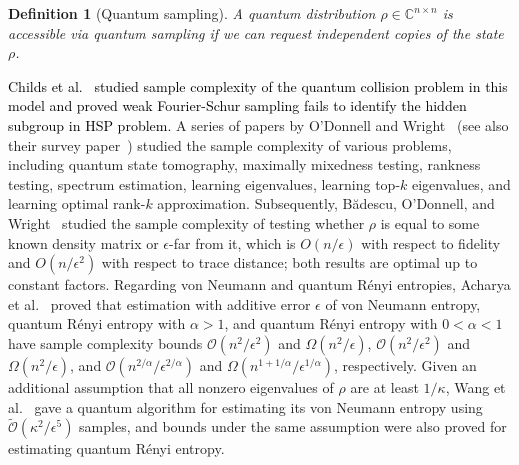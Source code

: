 \documentclass[journal]{IEEEtran}
\newtheorem{definition}{Definition}
\begin{document}
\begin{definition}[Quantum sampling]
    \label{defn:q-sample-def}
    A quantum distribution $\rho\in\mathbb{C}^{n\times n}$ is accessible via quantum sampling if we can request independent copies of the state $\rho$.
\end{definition}

\textcolor{black}{Childs et al.~\cite{childs2007weak} studied sample complexity of the quantum collision problem in this model and proved weak Fourier-Schur sampling fails to identify the hidden subgroup in HSP problem.} A series of papers by O'Donnell and Wright~\cite{OW15,OW16,OW17} (see also their survey paper~\cite{odonnell2017guest}) studied the sample complexity of various problems, including quantum state tomography, maximally mixedness testing, rankness testing, spectrum estimation, learning eigenvalues, learning top-$k$ eigenvalues, and learning optimal rank-$k$ approximation. Subsequently, B{\u{a}}descu, O'Donnell, and Wright~\cite{badescu2019quantum} studied the sample complexity of testing whether $\rho$ is equal to some known density matrix or $\epsilon$-far from it, which is $O(n/\epsilon)$ with respect to fidelity and $O(n/\epsilon^2)$ with respect to trace distance; both results are optimal up to constant factors. Regarding von Neumann and quantum R{\'e}nyi entropies, Acharya et al.~\cite{acharya2019measuring} proved that estimation with additive error $\epsilon$ of von Neumann entropy, quantum R{\'e}nyi entropy with $\alpha>1$, and quantum R{\'e}nyi entropy with $0<\alpha<1$ have sample complexity bounds $\mathcal{O}(n^{2}/\epsilon^{2})$ and $\Omega(n^{2}/\epsilon)$, $\mathcal{O}(n^{2}/\epsilon^{2})$ and $\Omega(n^{2}/\epsilon)$, and $\mathcal{O}(n^{2/\alpha}/\epsilon^{2/\alpha})$ and $\Omega(n^{1+1/\alpha}/\epsilon^{1/\alpha})$, respectively. Given an additional assumption that all nonzero eigenvalues of $\rho$ are at least $1/\kappa$, Wang et al.~\cite{wang2022quantum} gave a quantum algorithm for estimating its von Neumann entropy using $\widetilde{\mathcal{O}}(\kappa^{2}/\epsilon^{5})$ samples, and bounds under the same assumption were also proved for estimating quantum R{\'e}nyi entropy.
\end{document}
